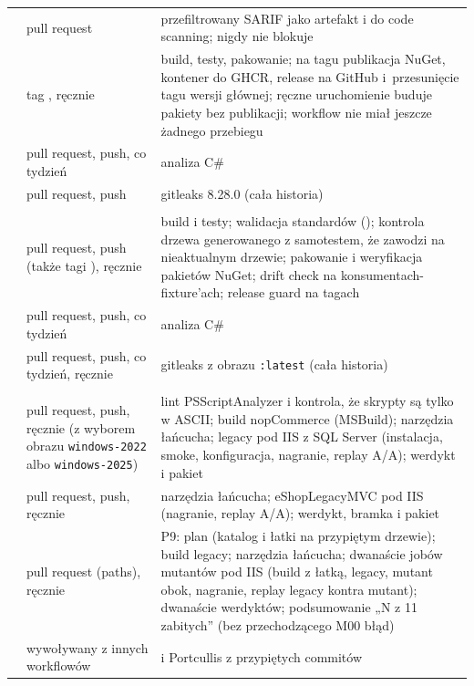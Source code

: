 \begin{xltabular}{\linewidth}{@{}>{\raggedright\arraybackslash}p{3.1cm} >{\raggedright\arraybackslash}p{4.1cm} >{\raggedright\arraybackslash}X@{}}
 & pull request & przefiltrowany SARIF jako artefakt i do code scanning; nigdy nie blokuje \\
 & tag , ręcznie & build, testy, pakowanie; na tagu publikacja NuGet, kontener do GHCR, release na GitHub i~przesunięcie tagu wersji głównej; ręczne uruchomienie buduje pakiety bez publikacji; workflow nie miał jeszcze żadnego przebiegu \\
 & pull request, push, co tydzień & analiza C\# \\
 & pull request, push & gitleaks 8.28.0 (cała historia) \\
\midrule
{} \\
 & pull request, push (także tagi ), ręcznie & build i testy; walidacja standardów (); kontrola drzewa generowanego z samotestem, że zawodzi na nieaktualnym drzewie; pakowanie i weryfikacja pakietów NuGet; drift check na konsumentach-fixture'ach; release guard na tagach \\
 & pull request, push, co tydzień & analiza C\# \\
 & pull request, push, co tydzień, ręcznie & gitleaks z obrazu \texttt{:latest} (cała historia) \\
\midrule
{} \\
 & pull request, push, ręcznie (z wyborem obrazu \texttt{windows-2022} albo \texttt{windows-2025}) & lint PSScriptAnalyzer i kontrola, że skrypty są tylko w ASCII; build nopCommerce (MSBuild); narzędzia łańcucha; legacy pod IIS z SQL Server (instalacja, smoke, konfiguracja, nagranie, replay A/A); werdykt i pakiet \\
 & pull request, push, ręcznie & narzędzia łańcucha; eShopLegacyMVC pod IIS (nagranie, replay A/A); werdykt, bramka i pakiet \\
 & pull request (paths), ręcznie & P9: plan (katalog i łatki na przypiętym drzewie); build legacy; narzędzia łańcucha; dwanaście jobów mutantów pod IIS (build z łatką, legacy, mutant obok, nagranie, replay legacy kontra mutant); dwanaście werdyktów; podsumowanie „N z 11 zabitych” (bez przechodzącego M00 błąd) \\
 & wywoływany z innych workflowów &  i Portcullis z przypiętych commitów \\

\end{xltabular}
